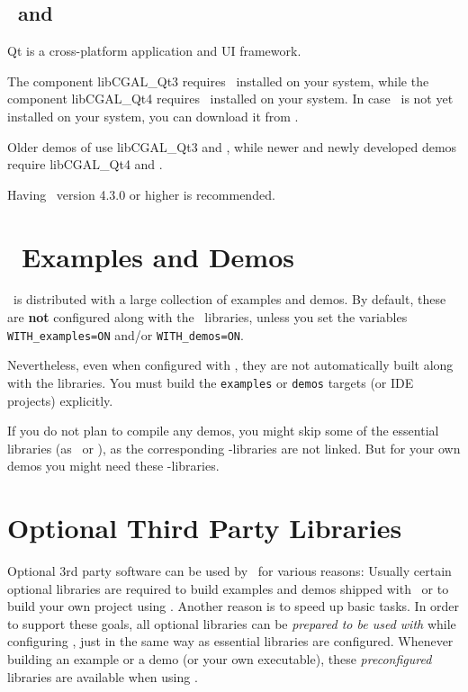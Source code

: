 \subsection{\ and \label{thirdparty:Qt3}\label{thirdparty:Qt4}\label{thirdparty:Qt}}

Qt is a cross-platform application and UI framework.

The component libCGAL\_Qt3 requires \ installed on your system, while
the component libCGAL\_Qt4 requires \ installed on your system. 
In case \qt\ is not yet installed on your system, you can download 
it from \qtpage. 

Older demos of \cgal use libCGAL\_Qt3 and , while newer and newly
developed demos require libCGAL\_Qt4 and . 

Having \ version 4.3.0 or higher is recommended.

\section{\cgal\ Examples and Demos}

\cgal\ is distributed with a large collection of examples and demos. By default, these are \textbf{not} configured along with
the \cgal\ libraries, unless you set the variables \texttt{WITH\_examples=ON} and/or \texttt{WITH\_demos=ON}.

Nevertheless, even when configured with \cgal, they are not automatically built along with the libraries.
You must build the \texttt{examples} or \texttt{demos} targets (or IDE projects) explicitly.

If you do not plan to compile any demos, you might skip some of the essential libraries (as \qt\ or
\opengl), as the corresponding \cgal-libraries are not linked. But for
your own demos you might need these \cgal-libraries.

\section{Optional Third Party Libraries\label{sec:optional3rdpartysoftware}}

Optional 3rd party software can be used by \cgal\ for various reasons:
Usually certain optional libraries are required to build examples and
demos shipped with \cgal\ or to build your own project using \cgal. 
Another reason is to speed up basic tasks. 
In order to support these goals, all optional libraries can be \emph{prepared to be
used with \cgal} while configuring \cgal, just in the same way as
essential libraries are configured. Whenever building an example or a
demo (or your own executable), these \emph{preconfigured} libraries
are available when using \cgal. 

